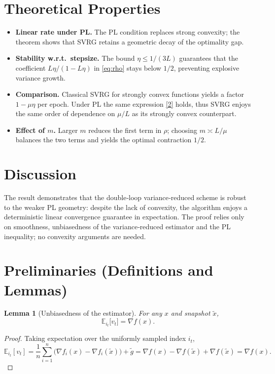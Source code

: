 \documentclass[11pt]{article}
\newtheorem{lemma}{Lemma}[section]
\begin{document}
\section*{Theoretical Properties}
\begin{itemize}
\item \textbf{Linear rate under PL.}  The PL condition replaces strong convexity;
the theorem shows that SVRG retains a geometric decay of the optimality gap.
\item \textbf{Stability w.r.t.\ stepsize.}  The bound $\eta\le 1/(3L)$ guarantees that
the coefficient $L\eta/(1-L\eta)$ in \eqref{eq:rho} stays below $1/2$, preventing
explosive variance growth.
\item \textbf{Comparison.}  Classical SVRG for strongly convex functions yields
a factor $1-\mu\eta$ per epoch.  Under PL the same expression \eqref{2}
holds, thus SVRG enjoys the same order of dependence on $\mu/L$
as its strongly convex counterpart.
\item \textbf{Effect of $m$.}  Larger $m$ reduces the first term in $\rho$;
choosing $m\asymp L/\mu$ balances the two terms and yields the optimal
contraction $1/2$.
\end{itemize}

\section*{Discussion}
The result demonstrates that the double‑loop variance‑reduced scheme is
robust to the weaker PL geometry: despite the lack of convexity, the
algorithm enjoys a deterministic linear convergence guarantee in expectation.
The proof relies only on smoothness, unbiasedness of the variance‑reduced
estimator and the PL inequality; no convexity arguments are needed.

\section*{Preliminaries (Definitions and Lemmas)}
\begin{lemma}[Unbiasedness of the estimator]\label{lem:unbiased}
For any $x$ and snapshot $\tilde{x}$,
\[
\mathbb{E}_{i_t}\!\bigl[v_t\bigr]=\nabla f(x).
\]
\end{lemma}
\begin{proof}
Taking expectation over the uniformly sampled index $i_t$,
\[
\mathbb{E}_{i_t}[v_t]
 =\frac{1}{n}\sum_{i=1}^{n}\bigl(\nabla f_i(x)-\nabla f_i(\tilde{x})\bigr)+\tilde{g}
 =\nabla f(x)-\nabla f(\tilde{x})+\nabla f(\tilde{x})
 =\nabla f(x).
\]
\end{proof}
\end{document}
